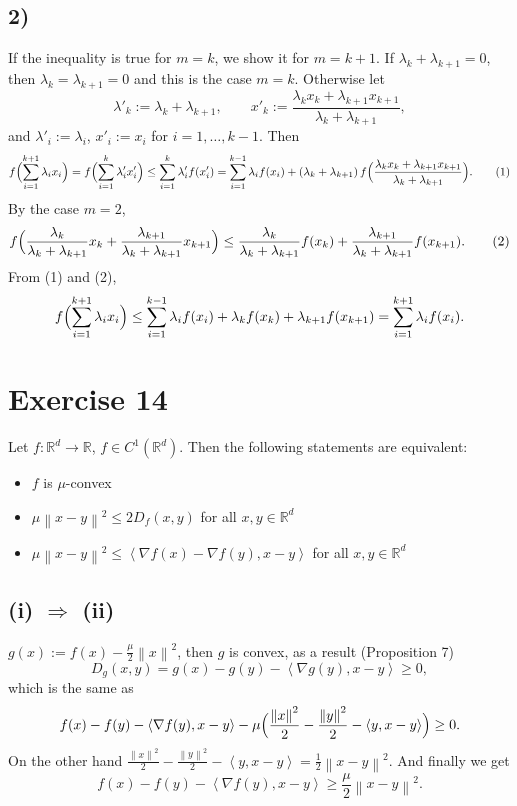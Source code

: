 \documentclass[11pt,a4paper]{article}
\newcommand{\R}{\mathbb{R}}
\newcommand{\norm}[1]{\left\| #1 \right\|}
\newcommand{\ip}[2]{\left\langle #1, #2 \right\rangle}
\begin{document}
\subsection*{2)}
If the inequality is true for $m = k$, we show it for $m = k+1$. If
$\lambda_k + \lambda_{k+1} = 0$, then $\lambda_k = \lambda_{k+1} = 0$ and this is the case
$m = k$. Otherwise let
\[
  \lambda'_k := \lambda_k + \lambda_{k+1}, \qquad
  x'_k := \frac{\lambda_k x_k + \lambda_{k+1} x_{k+1}}{\lambda_k + \lambda_{k+1}},
\]
and $\lambda'_i := \lambda_i$, $x'_i := x_i$ for $i = 1, \dots, k-1$. Then
\[
  f\Bigl(\sum_{i=1}^{k+1} \lambda_i x_i\Bigr) = f\Bigl(\sum_{i=1}^{k} \lambda'_i x'_i\Bigr)
  \le \sum_{i=1}^{k} \lambda'_i f(x'_i)
  = \sum_{i=1}^{k-1} \lambda_i f(x_i)
  + (\lambda_k + \lambda_{k+1})\, f\Bigl(\frac{\lambda_k x_k + \lambda_{k+1} x_{k+1}}{\lambda_k + \lambda_{k+1}}\Bigr). \tag{1}
\]
By the case $m = 2$,
\[
  f\Bigl(\frac{\lambda_k}{\lambda_k + \lambda_{k+1}} x_k + \frac{\lambda_{k+1}}{\lambda_k + \lambda_{k+1}} x_{k+1}\Bigr)
  \le \frac{\lambda_k}{\lambda_k + \lambda_{k+1}} f(x_k) + \frac{\lambda_{k+1}}{\lambda_k + \lambda_{k+1}} f(x_{k+1}). \tag{2}
\]
From (1) and (2),
\[
  f\Bigl(\sum_{i=1}^{k+1} \lambda_i x_i\Bigr)
  \le \sum_{i=1}^{k-1} \lambda_i f(x_i) + \lambda_k f(x_k) + \lambda_{k+1} f(x_{k+1})
  = \sum_{i=1}^{k+1} \lambda_i f(x_i).
\]

\section*{Exercise 14}

Let $f : \R^d \to \R$, $f \in C^1(\R^d)$. Then the following statements are equivalent:
\begin{itemize}
  \item[(i)] $f$ is $\mu$-convex
  \item[(ii)] $\mu\norm{x-y}^2 \le 2D_f(x,y)$ for all $x, y \in \R^d$
  \item[(iii)] $\mu\norm{x-y}^2 \le \ip{\nabla f(x) - \nabla f(y)}{x-y}$ for all $x, y \in \R^d$
\end{itemize}

\subsection*{(i) $\Rightarrow$ (ii)}
$g(x) := f(x) - \frac{\mu}{2}\norm{x}^2$, then $g$ is convex, as a result (Proposition 7)
\[
  D_g(x,y) = g(x) - g(y) - \ip{\nabla g(y)}{x-y} \ge 0,
\]
which is the same as
\[
  f(x) - f(y) - \ip{\nabla f(y)}{x-y}
  - \mu\Bigl(\frac{\norm{x}^2}{2} - \frac{\norm{y}^2}{2} - \ip{y}{x-y}\Bigr) \ge 0 .
\]
On the other hand $\frac{\norm{x}^2}{2} - \frac{\norm{y}^2}{2} - \ip{y}{x-y} = \frac12\norm{x-y}^2$.
And finally we get
\[
  f(x) - f(y) - \ip{\nabla f(y)}{x-y} \ge \frac{\mu}{2}\norm{x-y}^2 .
\]
\end{document}
